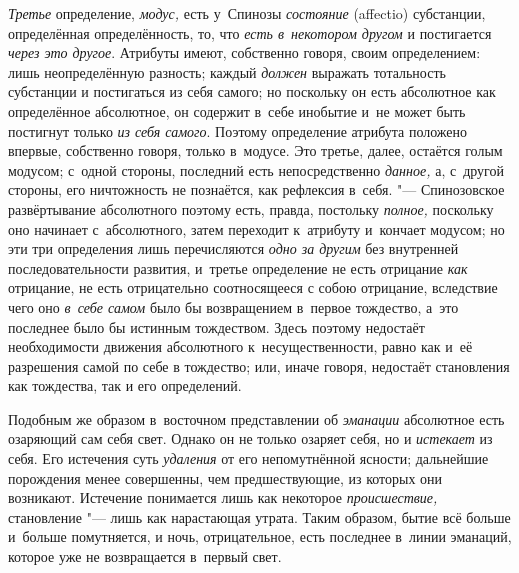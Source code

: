 {\em Третье} определение,
{\em модус,} есть у~Спинозы
{\em состояние} (affectio) субстанции, определённая
определённость, то, что {\em есть в~некотором другом} и
постигается {\em через это другое}. Атрибуты имеют,
собственно говоря, своим определением: лишь неопределённую разность; каждый
{\em должен} выражать тотальность субстанции и
постигаться из себя самого; но поскольку он есть абсолютное как
определённое абсолютное, он содержит в~себе инобытие и~не может быть
постигнут только {\em из себя самого}. Поэтому
определение атрибута положено впервые, собственно говоря, только в~модусе.
Это третье, далее, остаётся голым модусом; с~одной стороны, последний есть
непосредственно {\em данное,} а, с~другой стороны, его
ничтожность не познаётся, как рефлексия в~себя. "--- Спинозовское
развёртывание абсолютного поэтому есть, правда, постольку
{\em полное,} поскольку оно начинает с~абсолютного,
затем переходит к~атрибуту и~кончает модусом; но эти три определения лишь
перечисляются {\em одно за другим} без внутренней
последовательности развития, и~третье определение не есть отрицание
{\em как} отрицание, не есть отрицательно соотносящееся
с собою отрицание, вследствие чего оно {\em в~себе
самом} было бы возвращением в~первое тождество, а~это последнее было бы
истинным тождеством. Здесь поэтому недостаёт необходимости движения
абсолютного к~несущественности, равно как и~её разрешения самой по себе в
тождество; или, иначе говоря, недостаёт становления как тождества, так и
его определений.

Подобным же образом в~восточном представлении об
{\em эманации} абсолютное есть озаряющий сам себя свет.
Однако он не только озаряет себя, но и {\em истекает}
из себя. Его истечения суть {\em удаления} от его
непомутнённой ясности; дальнейшие порождения менее совершенны, чем
предшествующие, из которых они возникают. Истечение понимается лишь как
некоторое {\em происшествие,} становление "--- лишь как
нарастающая утрата. Таким образом, бытие всё больше и~больше помутняется, и
ночь, отрицательное, есть последнее в~линии эманаций, которое уже не
возвращается в~первый свет.

